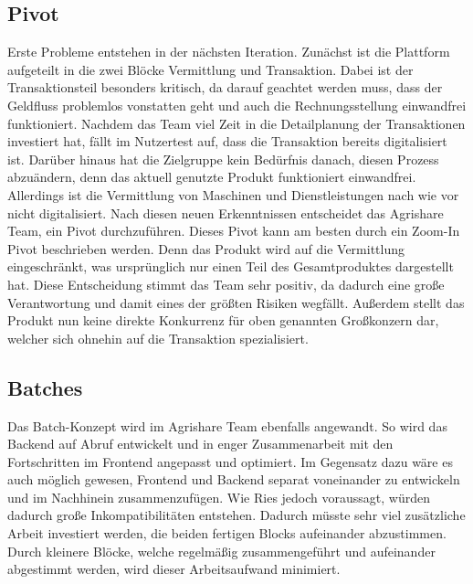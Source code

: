\subsection*{\label{sec:LeanStartup-Umsetzung-Pivot}\thesubsection\quad Pivot}Erste Probleme entstehen in der nächsten Iteration. Zunächst ist die Plattform aufgeteilt in die zwei Blöcke Vermittlung und Transaktion. Dabei ist der Transaktionsteil besonders kritisch, da darauf geachtet werden muss, dass der Geldfluss problemlos vonstatten geht und auch die Rechnungsstellung einwandfrei funktioniert. Nachdem das Team viel Zeit in die Detailplanung der Transaktionen investiert hat, fällt im Nutzertest auf, dass die Transaktion bereits digitalisiert ist. Darüber hinaus hat die Zielgruppe kein Bedürfnis danach, diesen Prozess abzuändern, denn das aktuell genutzte Produkt funktioniert einwandfrei. Allerdings ist die Vermittlung von Maschinen und Dienstleistungen nach wie vor nicht digitalisiert. Nach diesen neuen Erkenntnissen entscheidet das Agrishare Team, ein Pivot durchzuführen. Dieses Pivot kann am besten durch ein Zoom-In Pivot beschrieben werden. Denn das Produkt wird auf die Vermittlung eingeschränkt, was ursprünglich nur einen Teil des Gesamtproduktes dargestellt hat. Diese Entscheidung stimmt das Team sehr positiv, da dadurch eine große Verantwortung und damit eines der größten Risiken wegfällt. Außerdem stellt das Produkt nun keine direkte Konkurrenz für oben genannten Großkonzern dar, welcher sich ohnehin auf die Transaktion spezialisiert.

\subsection*{\label{sec:LeanStartup-Umsetzung-Batches}\thesubsection\quad Batches}Das Batch-Konzept wird im Agrishare Team ebenfalls angewandt. So wird das Backend auf Abruf entwickelt und in enger Zusammenarbeit mit den Fortschritten im Frontend angepasst und optimiert. Im Gegensatz dazu wäre es auch möglich gewesen, Frontend und Backend separat voneinander zu entwickeln und im Nachhinein zusammenzufügen. Wie Ries jedoch voraussagt, würden dadurch große Inkompatibilitäten entstehen. Dadurch müsste sehr viel zusätzliche Arbeit investiert werden, die beiden fertigen Blocks aufeinander abzustimmen. Durch kleinere Blöcke, welche regelmäßig zusammengeführt und aufeinander abgestimmt werden, wird dieser Arbeitsaufwand minimiert.

